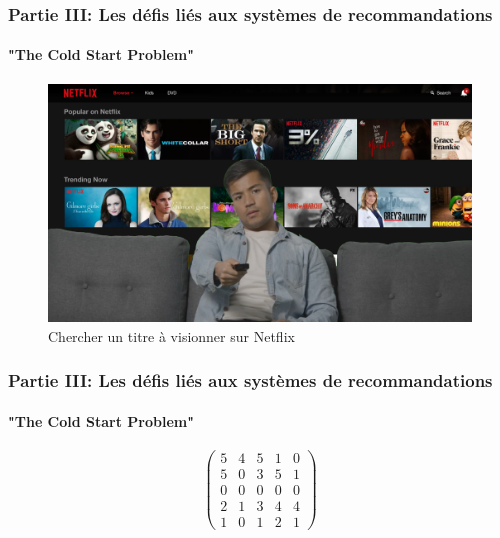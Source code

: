 \begin{frame}

    \frametitle{Partie III: Les défis liés aux systèmes de recommandations}
    \framesubtitle{"The Cold Start Problem"}

    \begin{figure}
        \centering
        \includegraphics[totalheight=5.5cm]{Images/PartieIII/GuyBrowsingNetflix.png}
        \caption{Chercher un titre à visionner sur Netflix}
    \end{figure}

\end{frame}

\begin{frame}

    \frametitle{Partie III: Les défis liés aux systèmes de recommandations}
    \framesubtitle{"The Cold Start Problem"}

    \begin{figure}
        \[
            \begin{pmatrix}
                5 & 4 & 5 & 1 & 0 \\
                5 & 0 & 3 & 5 & 1 \\
                0 & 0 & 0 & 0 & 0 \\
                2 & 1 & 3 & 4 & 4 \\
                1 & 0 & 1 & 2 & 1
            \end{pmatrix}
        \]

    \end{figure}

\end{frame}

